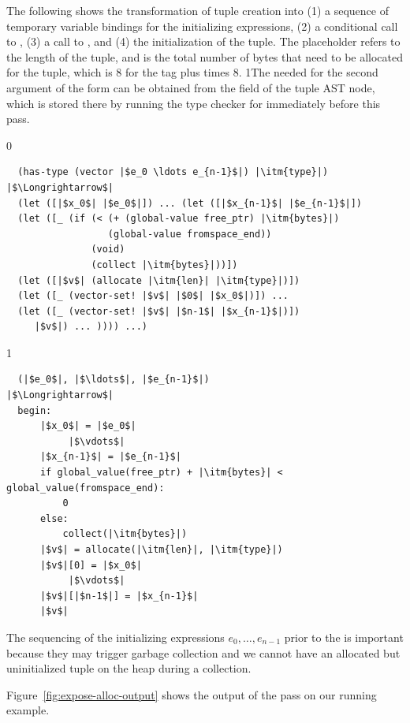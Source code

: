\documentclass[7x10]{TimesAPriori_MIT}%
\def\racketEd{0}
\def\pythonEd{1}
\def\edition{1}
\newcommand{\pythonColor}[0]{}
\newcommand{\python}[1]{{\if\edition\pythonEd\pythonColor #1\fi}}
\numberwithin{theorem}{chapter}
\numberwithin{definition}{chapter}
\numberwithin{equation}{chapter}
\begin{document}
The following shows the transformation of tuple creation into (1) a
sequence of temporary variable bindings for the initializing
expressions, (2) a conditional call to , (3) a call to
, and (4) the initialization of the tuple. The
 placeholder refers to the length of the tuple, and
 is the total number of bytes that need to be allocated for
the tuple, which is 8 for the tag plus  times 8.
%
\python{The  needed for the second argument of the
  \code{allocate} form can be obtained from the \code{has\_type} field
  of the tuple AST node, which is stored there by running the type
  checker for \LangVec{} immediately before this pass.}
%
\begin{center}
\begin{minipage}{\textwidth}
{\if\edition\racketEd
\begin{lstlisting}
  (has-type (vector |$e_0 \ldots e_{n-1}$|) |\itm{type}|)
|$\Longrightarrow$|
  (let ([|$x_0$| |$e_0$|]) ... (let ([|$x_{n-1}$| |$e_{n-1}$|])
  (let ([_ (if (< (+ (global-value free_ptr) |\itm{bytes}|)
                  (global-value fromspace_end))
               (void)
               (collect |\itm{bytes}|))])
  (let ([|$v$| (allocate |\itm{len}| |\itm{type}|)])
  (let ([_ (vector-set! |$v$| |$0$| |$x_0$|)]) ...
  (let ([_ (vector-set! |$v$| |$n-1$| |$x_{n-1}$|)])
     |$v$|) ... )))) ...)
\end{lstlisting}
\fi}
{\if\edition\pythonEd\pythonColor
\begin{lstlisting}
  (|$e_0$|, |$\ldots$|, |$e_{n-1}$|)
|$\Longrightarrow$|
  begin:
      |$x_0$| = |$e_0$|
           |$\vdots$|
      |$x_{n-1}$| = |$e_{n-1}$|
      if global_value(free_ptr) + |\itm{bytes}| < global_value(fromspace_end):
          0
      else:
          collect(|\itm{bytes}|)
      |$v$| = allocate(|\itm{len}|, |\itm{type}|)
      |$v$|[0] = |$x_0$|
           |$\vdots$|
      |$v$|[|$n-1$|] = |$x_{n-1}$|
      |$v$|
\end{lstlisting}
\fi}
\end{minipage}
\end{center}
%
\noindent The sequencing of the initializing expressions
$e_0,\ldots,e_{n-1}$ prior to the  is important because
they may trigger garbage collection and we cannot have an allocated
but uninitialized tuple on the heap during a collection.

Figure~\ref{fig:expose-alloc-output} shows the output of the
 pass on our running example.
\end{document}
